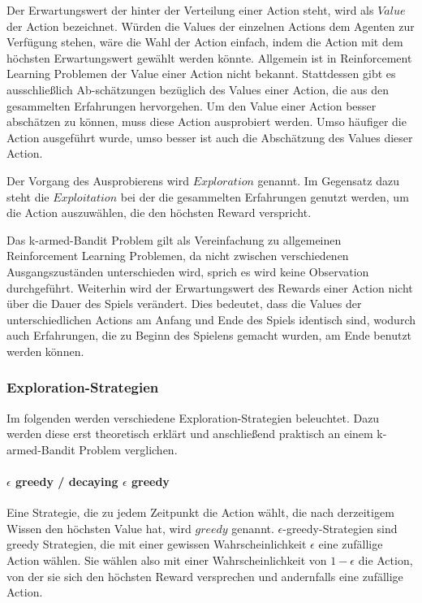 \documentclass[11pt]{scrartcl}
\begin{document}
Der Erwartungswert der hinter der Verteilung einer Action steht, wird als $Value$ der Action
bezeichnet. Würden die Values der einzelnen Actions dem Agenten zur Verfügung stehen, wäre die 
Wahl der Action einfach, indem die Action mit dem höchsten Erwartungswert gewählt werden 
könnte. Allgemein ist in Reinforcement Learning Problemen der Value einer Action nicht bekannt.
Stattdessen gibt es ausschließlich Ab-schätzungen bezüglich des Values einer Action, die aus den
gesammelten Erfahrungen hervorgehen. Um den Value einer Action besser abschätzen zu können,
muss diese Action ausprobiert werden. Umso häufiger die Action ausgeführt wurde, umso besser
ist auch die Abschätzung des Values dieser Action.

Der Vorgang des Ausprobierens wird $Exploration$ genannt. Im Gegensatz dazu steht die
$Exploitation$ bei der die gesammelten Erfahrungen genutzt werden, um die Action
auszuwählen, die den höchsten Reward verspricht.

Das k-armed-Bandit Problem gilt als Vereinfachung zu allgemeinen Reinforcement Learning
Problemen, da nicht zwischen verschiedenen Ausgangszuständen unterschieden wird, sprich
es wird keine Observation durchgeführt. Weiterhin wird der Erwartungswert des
Rewards einer Action nicht über die Dauer des Spiels verändert. Dies bedeutet, dass die
Values der unterschiedlichen Actions am Anfang und Ende des Spiels identisch sind, wodurch
auch Erfahrungen, die zu Beginn des Spielens gemacht wurden, am Ende benutzt werden
können.

\subsubsection{Exploration-Strategien}
Im folgenden werden verschiedene Exploration-Strategien beleuchtet. Dazu werden diese erst
theoretisch erklärt und anschließend praktisch an einem k-armed-Bandit Problem verglichen.

\paragraph{$\epsilon$ greedy / decaying $\epsilon$ greedy}
Eine Strategie, die zu jedem Zeitpunkt die Action wählt, die nach derzeitigem Wissen den
höchsten Value hat, wird $greedy$ genannt. $\epsilon$-greedy-Strategien sind greedy
Strategien, die mit einer gewissen Wahrscheinlichkeit $\epsilon$ eine zufällige Action
wählen. Sie wählen also mit einer Wahrscheinlichkeit von $1 - \epsilon$ die Action, von
der sie sich den höchsten Reward versprechen und andernfalls eine zufällige Action.
\end{document}
